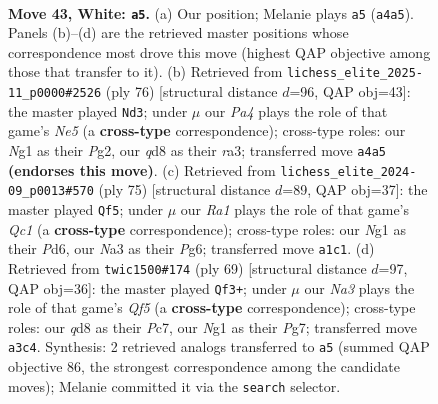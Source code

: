 \documentclass[11pt]{article}
\begin{document}
\clearpage

\begin{figure}[p]\centering
\begin{subfigure}{0.46\textwidth}\centering
\resizebox{\linewidth}{!}{%
\newchessgame
\chessboard[
  setfen={B2qn3/3b2k1/pr6/4Pp1p/P2P2p1/NnQ5/5PPP/R3K1N1 w - - 8 43},
  showmover=false,
  pgfstyle=straightmove, color=movearrow, markmove={a4-a5}
]}
\caption{}
\end{subfigure}\hfill
\begin{subfigure}{0.46\textwidth}\centering
\resizebox{\linewidth}{!}{%
\newchessgame
\chessboard[
  setfen={6k1/4bpp1/2p5/q2pNPn1/3B2Qp/rP5P/6P1/4R1K1 w - - 6 39},
  showmover=false,
  pgfstyle=straightmove, color=movearrow, markmove={e5-d3}
]}
\caption{}
\end{subfigure}
\\[4pt]
\begin{subfigure}{0.46\textwidth}\centering
\resizebox{\linewidth}{!}{%
\newchessgame
\chessboard[
  setfen={2q3k1/5p2/3p2p1/2pPb1Pp/2PnrN1P/1P6/3B2K1/3Q1R2 b - - 2 38},
  showmover=false,
  pgfstyle=straightmove, color=movearrow, markmove={c8-f5}
]}
\caption{}
\end{subfigure}\hfill
\begin{subfigure}{0.46\textwidth}\centering
\resizebox{\linewidth}{!}{%
\newchessgame
\chessboard[
  setfen={r5k1/2p2pp1/2p5/r1N2P2/1QPp1q1p/3P3n/2N1R2P/1R5K b - - 1 35},
  showmover=false,
  pgfstyle=straightmove, color=movearrow, markmove={f4-f3}
]}
\caption{}
\end{subfigure}
\caption{\textbf{Move 43, White: \texttt{a5}.} (a) Our position; Melanie plays \texttt{a5} (\texttt{a4a5}). Panels (b)--(d) are the retrieved master positions whose correspondence most drove this move (highest QAP objective among those that transfer to it). (b) Retrieved from \texttt{lichess\_elite\_2025-11\_p0000\#2526} (ply 76) [structural distance $d$=96, QAP obj=43]: the master played \texttt{Nd3}; under $\mu$ our \emph{Pa4} plays the role of that game's \emph{Ne5} (a \textbf{cross-type} correspondence); cross-type roles: our \emph{N}g1 as their \emph{P}g2, our \emph{q}d8 as their \emph{r}a3; transferred move \texttt{a4a5} \textbf{(endorses this move)}. (c) Retrieved from \texttt{lichess\_elite\_2024-09\_p0013\#570} (ply 75) [structural distance $d$=89, QAP obj=37]: the master played \texttt{Qf5}; under $\mu$ our \emph{Ra1} plays the role of that game's \emph{Qc1} (a \textbf{cross-type} correspondence); cross-type roles: our \emph{N}g1 as their \emph{P}d6, our \emph{N}a3 as their \emph{P}g6; transferred move \texttt{a1c1}. (d) Retrieved from \texttt{twic1500\#174} (ply 69) [structural distance $d$=97, QAP obj=36]: the master played \texttt{Qf3+}; under $\mu$ our \emph{Na3} plays the role of that game's \emph{Qf5} (a \textbf{cross-type} correspondence); cross-type roles: our \emph{q}d8 as their \emph{P}c7, our \emph{N}g1 as their \emph{P}g7; transferred move \texttt{a3c4}. Synthesis: 2 retrieved analogs transferred to \texttt{a5} (summed QAP objective 86, the strongest correspondence among the candidate moves); Melanie committed it via the \texttt{search} selector.}
\label{fig:thought-m84}
\end{figure}
\end{document}
